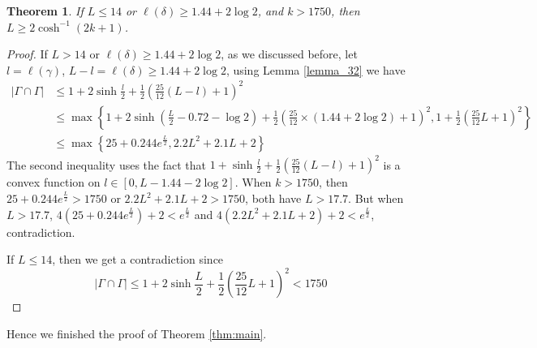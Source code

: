 \documentclass[11pt, a4paper]{article}
\newtheorem{thm}{Theorem}[section]
\theoremstyle{definition}
\theoremstyle{remark}
\newcommand{\abs}[1]{\left| #1 \right|}
\newcommand{\bracket}[1]{\left( #1 \right)}
\begin{document}
\begin{thm}
 If $L\leqslant14$ or $\ell(\delta)\geqslant1.44+2\log2$, and $k>1750$, then $L\geqslant2\cosh^{-1}(2k+1)$.
\end{thm}

\begin{proof}
 If $L>14$ or $\ell(\delta)\geqslant1.44+2\log2$, as we discussed before, let $l=\ell(\gamma)$, $L-l=\ell(\delta)\geqslant1.44+2\log2$, using Lemma \ref{lemma_32} we have
\begin{align*}
\abs{\Gamma\cap\Gamma}&\leqslant1+2\sinh\frac{l}2+\frac12\bracket{\frac{25}{12}(L-l)+1}^2\\
&\leqslant\max\left\{1+2\sinh\bracket{\frac{L}2-0.72-\log2}+\frac12\bracket{\frac{25}{12}\times(1.44+2\log2)+1}^2, 1+\frac12\bracket{\frac{25}{12}L+1}^2\right\}\\
&\leqslant\max\left\{25+0.244e^{\frac{L}2}, 2.2L^2+2.1L+2\right\}
\end{align*}
The second inequality uses the fact that $1+\sinh\frac{l}2+\frac12\bracket{\frac{25}{12}(L-l)+1}^2$ is a convex function on $l\in[0,L-1.44-2\log2]$. When $k>1750$, then $25+0.244e^{\frac{L}2}>1750$ or $2.2L^2+2.1L+2>1750$, both have $L>17.7$. But when $L>17.7$, $4(25+0.244e^{\frac{L}2})+2<e^{\frac{L}2}$ and $4(2.2L^2+2.1L+2)+2<e^{\frac{L}2}$, contradiction.

If $L\leqslant14$, then we get a contradiction since
$$\abs{\Gamma\cap\Gamma}\leqslant1+2\sinh\frac{L}2+\frac12\bracket{\frac{25}{12}L+1}^2<1750$$


\end{proof}

Hence we finished the proof of Theorem \ref{thm:main}.
\end{document}
